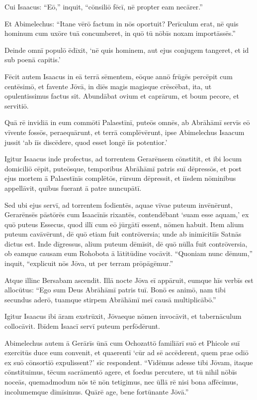 Cui Isaacus: ``Eō,'' inquit, ``cōnsiliō fēcī, nē propter eam necārer.''

\Versus Et Abimelechus: ``Itane vērō factum in nōs oportuit? Perīculum erat, nē quis hominum cum uxōre tuā concumberet, in quō tū nōbīs noxam importāssēs.''

\Versus Deinde omnī populō ēdīxit, `nē quis hominem, aut ejus conjugem tangeret, et id sub poenā capitis.'

\Versus Fēcit autem Isaacus in eā terrā sēmentem, eōque annō frūgēs percēpit cum centēsimō, et favente Jōvā, in diēs magis magisque crēscēbat,
\Versus ita, ut opulentissimus factus sit.
\Versus Abundābat ovium et caprārum, et boum pecore, et servitiō.

Quā rē invidiā in eum commōtī Palaestīnī,
\Versus puteōs omnēs, ab Abrāhāmī servīs eō vīvente fossōs, peraequārunt, et terrā complēvērunt,
\Versus ipse Abimelechus Isaacum jussit `ab iīs discēdere, quod esset longē iīs potentior.'

\Versus Igitur Isaacus inde profectus, ad torrentem Gerarēnsem cōnstitit, et ibi locum domiciliō cēpit,
\Versus puteōsque, temporibus Abrāhāmī patris suī dēpressōs, et post ejus mortem ā Palaestīnīs complētōs, rūrsum dēpressit, et iīsdem nōminibus appellāvit, quibus fuerant ā patre nuncupātī.

\Versus Sed ubi ejus servī, ad torrentem fodientēs, aquae vīvae puteum invēnērunt,
\Versus Gerarēnsēs pāstōrēs cum Isaacīnīs rixantēs, contendēbant `suam esse aquam,' ex quō puteus Essecus, quod illī cum eō jūrgātī essent, nōmen habuit.
\Versus Item alium puteum cavāvērunt, dē quō etiam fuit contrōversia; unde ab inimīcitiīs Satnās dictus est.
\Versus Inde dīgressus, alium puteum dēmīsit, dē quō nūlla fuit contrōversia, ob eamque causam eum Rohobota ā lātitūdine vocāvit. ``Quoniam nunc dēmum,'' inquit, ``explicuit nōs Jōva, ut per terram prōpāgēmur.''

\Versus Atque illinc Bersabam ascendit.
\Versus Illā nocte Jōva eī appāruit, eumque hīs verbīs est allocūtus: ``Ego sum Deus Abrāhāmī patris tuī. Bonō es animō, nam tibi secundus aderō, tuamque stirpem Abrāhāmī meī causā multiplicābō.''

\Versus Igitur Isaacus ibi āram exstrūxit, Jōvaeque nōmen invocāvit, et tabernāculum collocāvit. Ibīdem Isaacī servī puteum perfōdērunt.

\Versus Abimelechus autem ā Gerārīs ūnā cum Ochozattō familiārī suō et Phicole suī exercitūs duce eum convenit,
\Versus et quaerentī `cūr ad sē accēderent, quem prae odiō ex suō cōnsortiō expulissent?' sīc respondent.
\Versus ``Vidēmus adesse tibi Jōvam, itaque cōnstituimus, tēcum sacrāmentō agere, et foedus percutere,
\Versus ut tū nihil nōbīs noceās, quemadmodum nōs tē nōn tetigimus, nec ūllā rē nisi bona affēcimus, incolumemque dīmīsimus. Quārē age, bene fortūnante Jōvā.''

